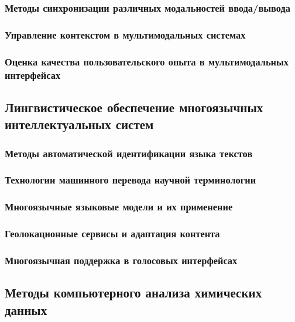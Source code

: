 \documentclass{syksu-coursework}
\begin{document}
\subsubsection{Методы синхронизации различных модальностей ввода/вывода}

\subsubsection{Управление контекстом в мультимодальных системах}

\subsubsection{Оценка качества пользовательского опыта в мультимодальных интерфейсах}

\subsection{Лингвистическое обеспечение многоязычных интеллектуальных систем}

\subsubsection{Методы автоматической идентификации языка текстов}

\subsubsection{Технологии машинного перевода научной терминологии}

\subsubsection{Многоязычные языковые модели и их применение}

\subsubsection{Геолокационные сервисы и адаптация контента}

\subsubsection{Многоязычная поддержка в голосовых интерфейсах}

\subsection{Методы компьютерного анализа химических данных}
\end{document}
